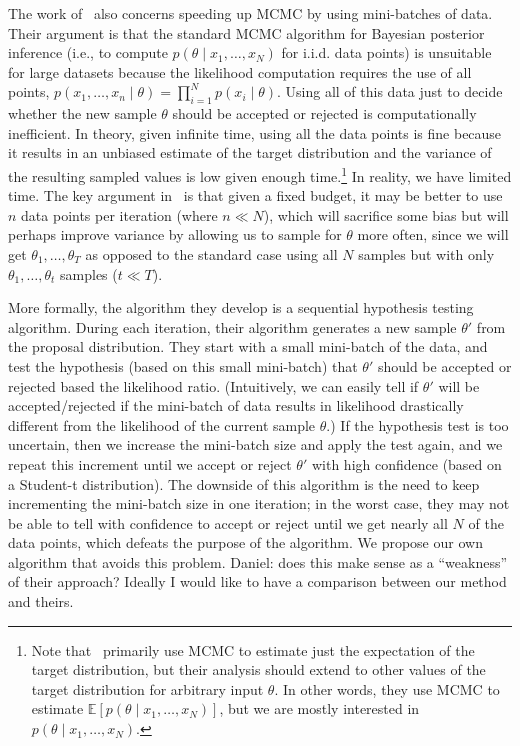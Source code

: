 \documentclass{article}
\begin{document}
The work of~\cite{cutting_mh_2014} also concerns speeding up MCMC by using mini-batches of data.
Their argument is that the standard MCMC algorithm for Bayesian posterior inference (i.e., to
compute $p(\theta \mid x_1, \ldots, x_N)$ for i.i.d. data points) is unsuitable for large datasets
because the likelihood computation requires the use of all points, $p(x_1, \ldots, x_n \mid \theta)
= \prod_{i=1}^Np(x_i\mid \theta)$. Using all of this data just to decide whether the new sample
$\theta$ should be accepted or rejected is computationally inefficient. In theory, given infinite
time, using all the data points is fine because it results in an unbiased estimate of the target
distribution and the variance of the resulting sampled values is low given enough
time.\footnote{Note that~\cite{cutting_mh_2014} primarily use MCMC to estimate just the expectation
of the target distribution, but their analysis should extend to other values of the target
distribution for arbitrary input $\theta$. In other words, they use MCMC to estimate
$\mathbb{E}[p(\theta \mid x_1, \ldots, x_N)]$, but we are mostly interested in $p(\theta \mid x_1,
\ldots, x_N)$.} In reality, we have limited time. The key argument in~\cite{cutting_mh_2014} is that
given a fixed budget, it may be better to use $n$ data points per iteration (where $n \ll N$), which
will sacrifice some bias but will perhaps improve variance by allowing us to sample for $\theta$
more often, since we will get $\theta_1, \ldots, \theta_T$ as opposed to the standard case using all
$N$ samples but with only $\theta_1, \ldots, \theta_t$ samples ($t \ll T$).

More formally, the algorithm they develop is a sequential hypothesis testing algorithm. During each
iteration, their algorithm generates a new sample $\theta'$ from the proposal distribution. They
start with a small mini-batch of the data, and test the hypothesis (based on this small mini-batch)
that $\theta'$ should be accepted or rejected based the likelihood ratio. (Intuitively, we can
easily tell if $\theta'$ will be accepted/rejected if the mini-batch of data results in likelihood
drastically different from the likelihood of the current sample $\theta$.) If the hypothesis test is
too uncertain, then we increase the mini-batch size and apply the test again, and we repeat this
increment until we accept or reject $\theta'$ with high confidence (based on a Student-t
distribution). The downside of this algorithm is the need to keep incrementing the mini-batch size
in one iteration; in the worst case, they may not be able to tell with confidence to accept or
reject until we get nearly all $N$ of the data points, which defeats the purpose of the algorithm.
We propose our own algorithm that avoids this problem. {\color{blue} Daniel: does this make sense as
a ``weakness'' of their approach?  Ideally I would like to have a comparison between our method and
theirs.}
\end{document}
